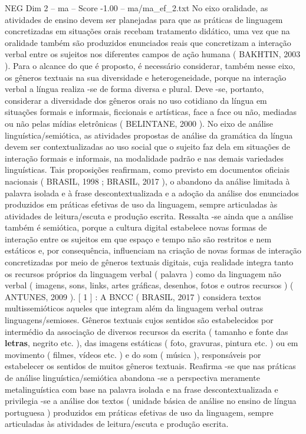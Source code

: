 \begin{textsample}{NEG Dim 2 – ma – Score -1.00 – ma/ma\_ef\_2.txt}
No eixo oralidade, as atividades de ensino devem ser planejadas para que as práticas de linguagem concretizadas em situações orais recebam tratamento didático, uma vez que na oralidade também são produzidos enunciados reais que concretizam a interação verbal entre os sujeitos nos diferentes campos de ação humana ( BAKHTIN, 2003 ).
Para o alcance do que é proposto, é necessário considerar, também nesse eixo, os gêneros textuais na sua diversidade e heterogeneidade, porque na interação verbal a língua realiza -se de forma diversa e plural.
Deve -se, portanto, considerar a diversidade dos gêneros orais no uso cotidiano da língua em situações formais e informais, ficcionais e artísticas, face a face ou não, mediadas ou não pelas mídias eletrônicas ( BELINTANE, 2000 ).
No eixo de análise linguística/semiótica, as atividades propostas de análise da gramática da língua devem ser contextualizadas ao uso social que o sujeito faz dela em situações de interação formais e informais, na modalidade padrão e nas demais variedades linguísticas.
Tais proposições reafirmam, como previsto em documentos oficiais nacionais ( BRASIL, 1998 ; BRASIL, 2017 ), o abandono da análise limitada à palavra isolada e à frase descontextualizada e a adoção da análise dos enunciados produzidos em práticas efetivas de uso da linguagem, sempre articuladas às atividades de leitura/escuta e produção escrita.
Ressalta -se ainda que a análise também é semiótica, porque a cultura digital estabelece novas formas de interação entre os sujeitos em que espaço e tempo não são restritos e nem estáticos e, por consequência, influenciam na criação de novas formas de interação concretizadas por meio de gêneros textuais digitais, cuja realidade integra tanto os recursos próprios da linguagem verbal ( palavra ) como da linguagem não verbal ( imagens, sons, links, artes gráficas, desenhos, fotos e outros recursos ) ( ANTUNES, 2009 ). [ 1 ] : A BNCC ( BRASIL, 2017 ) considera textos multissemióticos aqueles que integram além da linguagem verbal outras linguagens/semioses.
Gêneros textuais cujos sentidos são estabelecidos por intermédio da associação de diversos recursos da escrita ( tamanho e fonte das \textbf{letras}, negrito etc. ), das imagens estáticas ( foto, gravuras, pintura etc. ) ou em movimento ( filmes, vídeos etc. ) e do som ( música ), responsáveis por estabelecer os sentidos de muitos gêneros textuais.
Reafirma -se que nas práticas de análise linguística/semiótica abandona -se a perspectiva meramente metalinguística com base na palavra isolada e na frase descontextualizada e privilegia -se a análise dos textos ( unidade básica de análise no ensino de língua portuguesa ) produzidos em práticas efetivas de uso da linguagem, sempre articuladas às atividades de leitura/escuta e produção escrita.

\end{textsample}
